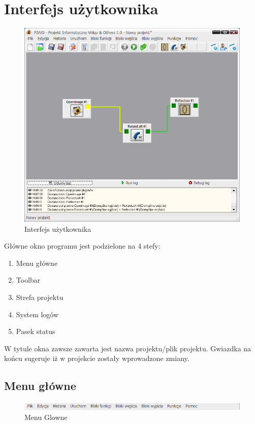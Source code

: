 \documentclass[a4paper,10pt]{article}
\begin{document}
\section{Interfejs użytkownika}
\begin{figure}[h]
 \centering
 \includegraphics[scale=0.5]{main}
 \caption{Interfejs użytkownika}
 \label{fig:Interface}
\end{figure}
\newpage
Główne okno programu jest podzielone na 4 stefy:
\begin{enumerate}
 \item Menu główne
 \item Toolbar
 \item Strefa projektu
 \item System logów
 \item Pasek status
\end{enumerate}
W tytule okna zawsze zawarta jest nazwa projektu/plik projektu. Gwiazdka na końcu sugeruje iż w projekcie zostały wprowadzone zmiany.
\subsection{Menu główne}
\begin{figure}[h]
 \centering
 \includegraphics[scale=0.5]{menuglowne}
 \caption{Menu Glowne}
 \label{fig:Interface}
\end{figure}
\end{document}
